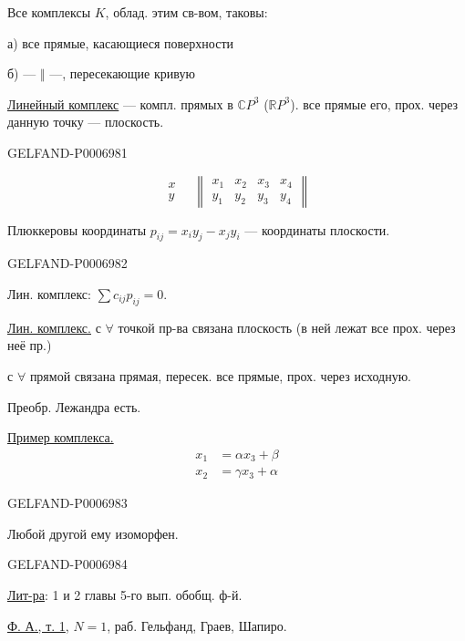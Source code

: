 Все комплексы \(K\), облад. этим св-вом, таковы:

а) все прямые, касающиеся поверхности

б) --- \(\Vert\) ---, пересекающие кривую

\underline{Линейный комплекс} --- компл. прямых в \(\mathbb CP^3\) (\(\mathbb RP^3\)).
все прямые его, прох. через данную точку --- плоскость.


\begin{GelfandAdjacentEvidence}{GELFAND-P000698}{1}

\[
\begin{array}{c}x\\y\end{array}
\quad
\begin{Vmatrix}
x_1 & x_2 & x_3 & x_4\\
y_1 & y_2 & y_3 & y_4
\end{Vmatrix}
\]

Плюккеровы координаты \(p_{ij}=x_i y_j-x_j y_i\) --- координаты плоскости.
\end{GelfandAdjacentEvidence}
\begin{GelfandAdjacentEvidence}{GELFAND-P000698}{2}


Лин. комплекс: \(\sum c_{ij}p_{ij}=0\).

\underline{Лин. комплекс.}
с \(\forall\) точкой пр-ва связана плоскость (в ней лежат все прох. через неё пр.)

с \(\forall\) прямой связана прямая, пересек. все прямые, прох. через исходную.

Преобр. Лежандра есть.

\underline{Пример комплекса.}
\[
\begin{aligned}
x_1&=\alpha x_3+\beta\\
x_2&=\gamma x_3+\alpha
\end{aligned}
\]
\end{GelfandAdjacentEvidence}
\begin{GelfandAdjacentEvidence}{GELFAND-P000698}{3}


Любой другой ему изоморфен.
\end{GelfandAdjacentEvidence}
\begin{GelfandAdjacentEvidence}{GELFAND-P000698}{4}


\underline{Лит-ра}: 1 и 2 главы 5-го вып. обобщ. ф-й.

\href{https://www.mathnet.ru/eng/faa2803}{Ф. А., т. 1}, \(N=1\), раб. Гельфанд, Граев, Шапиро.
\end{GelfandAdjacentEvidence}



